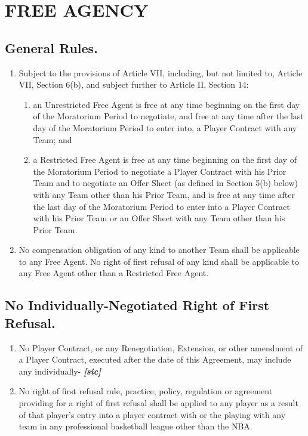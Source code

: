 \documentclass[
]{book}
\providecommand{\tightlist}{%
  \setlength{\itemsep}{0pt}\setlength{\parskip}{0pt}}
\begin{document}
\hypertarget{free-agency}{%
\chapter{FREE AGENCY}\label{free-agency}}

\hypertarget{general-rules.}{%
\section{General Rules.}\label{general-rules.}}

\begin{enumerate}
\def\labelenumi{(\alph{enumi})}
\tightlist
\item
  Subject to the provisions of Article VII, including, but not limited to, Article VII, Section 6(b), and subject further to Article II, Section 14:

  \begin{enumerate}
  \def\labelenumii{(\roman{enumii})}
  \tightlist
  \item
    an Unrestricted Free Agent is free at any time beginning on the first day of the Moratorium Period to negotiate, and free at any time after the last day of the Moratorium Period to enter into, a Player Contract with any Team; and
  \item
    a Restricted Free Agent is free at any time beginning on the first day of the Moratorium Period to negotiate a Player Contract with his Prior Team and to negotiate an Offer Sheet (as defined in Section 5(b) below) with any Team other than his Prior Team, and is free at any time after the last day of the Moratorium Period to enter into a Player Contract with his Prior Team or an Offer Sheet with any Team other than his Prior Team.
  \end{enumerate}
\item
  No compensation obligation of any kind to another Team shall be applicable to any Free Agent. No right of first refusal of any kind shall be applicable to any Free Agent other than a Restricted Free Agent.
\end{enumerate}

\hypertarget{no-individually-negotiated-right-of-first-refusal.}{%
\section{No Individually-Negotiated Right of First Refusal.}\label{no-individually-negotiated-right-of-first-refusal.}}

\begin{enumerate}
\def\labelenumi{(\alph{enumi})}
\tightlist
\item
  No Player Contract, or any Renegotiation, Extension, or other amendment of a Player Contract, executed after the date of this Agreement, may include any individually- \textbf{\emph{{[}sic{]}}}
\item
  No right of first refusal rule, practice, policy, regulation or agreement providing for a right of first refusal shall be applied to any player as a result of that player's entry into a player contract with or the playing with any team in any professional basketball league other than the NBA.
\end{enumerate}
\end{document}
